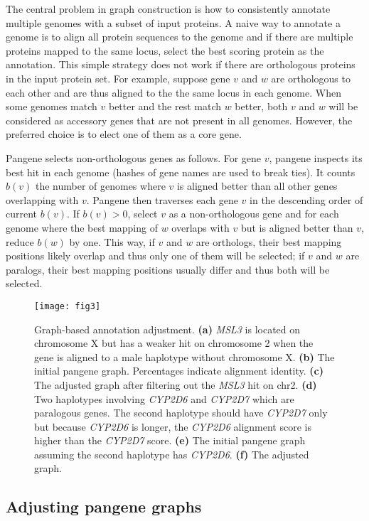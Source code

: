 \documentclass[webpdf,contemporary,large,namedate]{oup-authoring-template}%
\begin{document}
The central problem in graph construction is how to consistently annotate multiple genomes with a subset of input proteins.
A naive way to annotate a genome is to align all protein sequences to the genome
and if there are multiple proteins mapped to the same locus, select the best scoring protein as the annotation.
This simple strategy does not work if there are orthologous proteins in the input protein set.
For example, suppose gene $v$ and $w$ are orthologous to each other and are thus aligned to the the same locus in each genome.
When some genomes match $v$ better and the rest match $w$ better,
both $v$ and $w$ will be considered as accessory genes that are not present in all genomes.
However, the preferred choice is to elect one of them as a core gene.

Pangene selects non-orthologous genes as follows.
For gene $v$, pangene inspects its best hit in each genome (hashes of gene names are used to break ties).
It counts $b(v)$ the number of genomes where $v$ is aligned better than all other genes overlapping with $v$.
Pangene then traverses each gene $v$ in the descending order of current $b(v)$.
If $b(v)>0$, select $v$ as a non-orthologous gene and for each genome where the best mapping of $w$ overlaps with $v$ but is aligned better than $v$, reduce $b(w)$ by one.
This way, if $v$ and $w$ are orthologs, their best mapping positions likely overlap and thus only one of them will be selected;
if $v$ and $w$ are paralogs, their best mapping positions usually differ and thus both will be selected.

\begin{figure}[tb!]
\centering
\texttt{[image: fig3]}
\caption{Graph-based annotation adjustment.
{\bf (a)} \emph{MSL3} is located on chromosome X but has a weaker hit on chromosome 2 when the gene
is aligned to a male haplotype without chromosome X.
{\bf (b)} The initial pangene graph. Percentages indicate alignment identity.
{\bf (c)} The adjusted graph after filtering out the \emph{MSL3} hit on chr2.
{\bf (d)} Two haplotypes involving \emph{CYP2D6} and \emph{CYP2D7} which are paralogous genes.
The second haplotype should have \emph{CYP2D7} only but because \emph{CYP2D6} is longer, the \emph{CYP2D6} alignment score is higher than the \emph{CYP2D7} score.
{\bf (e)} The initial pangene graph assuming the second haplotype has \emph{CYP2D6}.
{\bf (f)} The adjusted graph.
}\label{fig:resolve}
\end{figure}

\subsection{Adjusting pangene graphs}
\end{document}
